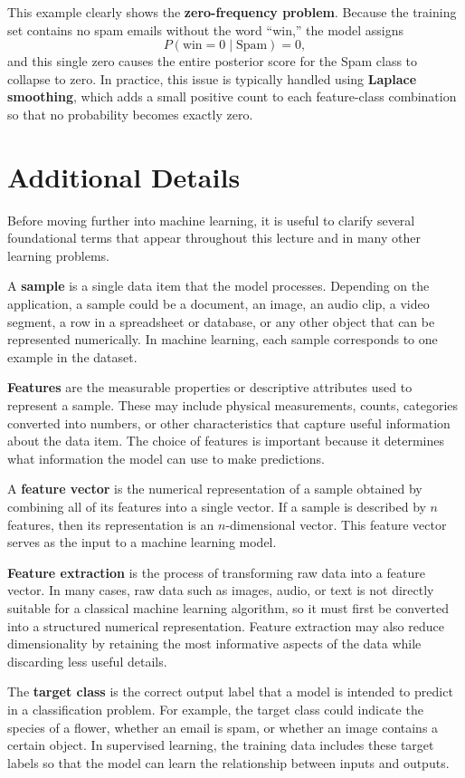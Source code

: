 \documentclass{article}
\begin{document}
This example clearly shows the \textbf{zero-frequency problem}. Because the training set contains no spam emails without the word ``win,'' the model assigns
\[
P(\text{win}=0 \mid \text{Spam}) = 0,
\]
and this single zero causes the entire posterior score for the Spam class to collapse to zero. In practice, this issue is typically handled using \textbf{Laplace smoothing}, which adds a small positive count to each feature-class combination so that no probability becomes exactly zero.

\section{Additional Details}

Before moving further into machine learning, it is useful to clarify several foundational terms that appear throughout this lecture and in many other learning problems.

A \textbf{sample} is a single data item that the model processes. Depending on the application, a sample could be a document, an image, an audio clip, a video segment, a row in a spreadsheet or database, or any other object that can be represented numerically. In machine learning, each sample corresponds to one example in the dataset.

\textbf{Features} are the measurable properties or descriptive attributes used to represent a sample. These may include physical measurements, counts, categories converted into numbers, or other characteristics that capture useful information about the data item. The choice of features is important because it determines what information the model can use to make predictions.

A \textbf{feature vector} is the numerical representation of a sample obtained by combining all of its features into a single vector. If a sample is described by \(n\) features, then its representation is an \(n\)-dimensional vector. This feature vector serves as the input to a machine learning model.

\textbf{Feature extraction} is the process of transforming raw data into a feature vector. In many cases, raw data such as images, audio, or text is not directly suitable for a classical machine learning algorithm, so it must first be converted into a structured numerical representation. Feature extraction may also reduce dimensionality by retaining the most informative aspects of the data while discarding less useful details.

The \textbf{target class} is the correct output label that a model is intended to predict in a classification problem. For example, the target class could indicate the species of a flower, whether an email is spam, or whether an image contains a certain object. In supervised learning, the training data includes these target labels so that the model can learn the relationship between inputs and outputs.
\end{document}
